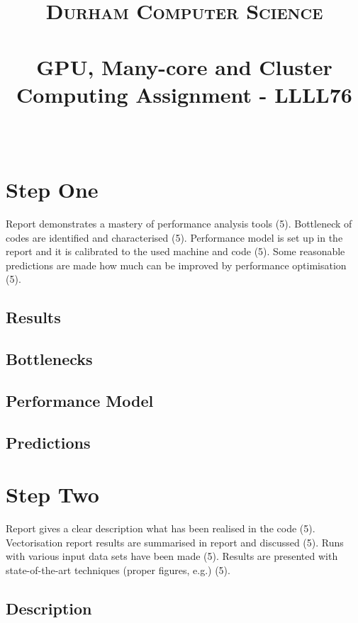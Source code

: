 \documentclass[paper=a4, fontsize=11pt]{scrartcl}
\date{}
\title{
		\vspace{-1in} 	
		\usefont{OT1}{bch}{b}{n}
		\normalfont \normalsize \textsc{Durham Computer Science} \\ [5pt]
		\horrule{0.5pt} \\[0.4cm]
		\huge  GPU, Many-core and Cluster Computing Assignment - LLLL76\\
		\horrule{2pt} \\[0.5cm]
		\vspace{-1in} 	
}
\numberwithin{equation}{section}		%
\numberwithin{figure}{section}			%
\numberwithin{table}{section}				%
\begin{document}
\maketitle
\section{Step One}
Report demonstrates a mastery of performance analysis tools (5). Bottleneck of codes are identified and characterised (5). Performance model is set up in the report and it is calibrated to the used machine and code (5). Some reasonable predictions are made how much can be improved by performance optimisation (5).
\subsection{Results}

\subsection{Bottlenecks}

\subsection{Performance Model}

\subsection{Predictions}

\section{Step Two}
Report gives a clear description what has been realised in the code (5). Vectorisation report results are summarised in report and discussed (5). Runs with various input data sets have been made (5). Results are presented with state-of-the-art techniques (proper figures, e.g.) (5).
\subsection{Description}
\end{document}
